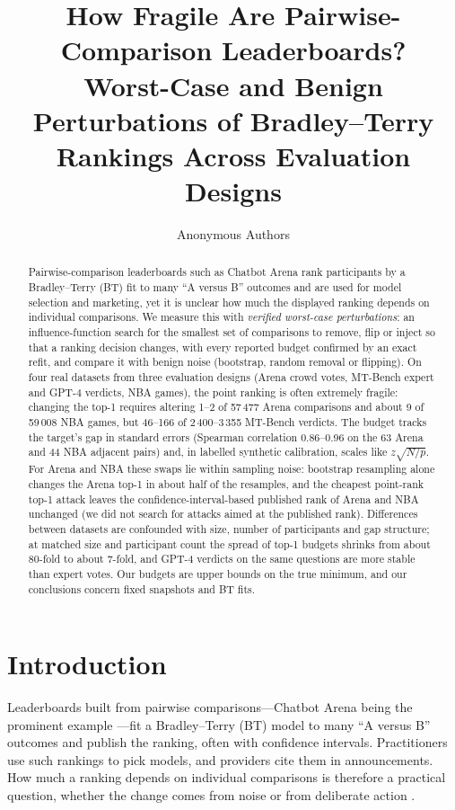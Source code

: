 \documentclass{article}
\title{How Fragile Are Pairwise-Comparison Leaderboards? \\
Worst-Case and Benign Perturbations of Bradley--Terry Rankings Across Evaluation Designs}
\author{Anonymous Authors}
\begin{document}
\maketitle

\begin{abstract}
Pairwise-comparison leaderboards such as Chatbot Arena rank participants by a Bradley--Terry (BT) fit to many ``A versus B'' outcomes and are used for model selection and marketing, yet it is unclear how much the displayed ranking depends on individual comparisons.
We measure this with \emph{verified worst-case perturbations}: an influence-function search for the smallest set of comparisons to remove, flip or inject so that a ranking decision changes, with every reported budget confirmed by an exact refit, and compare it with benign noise (bootstrap, random removal or flipping).
On four real datasets from three evaluation designs (Arena crowd votes, MT-Bench expert and GPT-4 verdicts, NBA games), the point ranking is often extremely fragile: changing the top-1 requires altering 1--2 of 57\,477 Arena comparisons and about 9 of 59\,008 NBA games, but 46--166 of 2\,400--3\,355 MT-Bench verdicts.
The budget tracks the target's gap in standard errors (Spearman correlation 0.86--0.96 on the 63 Arena and 44 NBA adjacent pairs) and, in labelled synthetic calibration, scales like $z\sqrt{N/p}$.
For Arena and NBA these swaps lie within sampling noise: bootstrap resampling alone changes the Arena top-1 in about half of the resamples, and the cheapest point-rank top-1 attack leaves the confidence-interval-based published rank of Arena and NBA unchanged (we did not search for attacks aimed at the published rank).
Differences between datasets are confounded with size, number of participants and gap structure; at matched size and participant count the spread of top-1 budgets shrinks from about 80-fold to about 7-fold, and GPT-4 verdicts on the same questions are more stable than expert votes.
Our budgets are upper bounds on the true minimum, and our conclusions concern fixed snapshots and BT fits.
\end{abstract}

\section{Introduction}\label{sec:intro}
Leaderboards built from pairwise comparisons---Chatbot Arena being the prominent example \citep{chiang2024arena}---fit a Bradley--Terry (BT) model \citep{bradley1952} to many ``A versus B'' outcomes and publish the ranking, often with confidence intervals. Practitioners use such rankings to pick models, and providers cite them in announcements. How much a ranking depends on individual comparisons is therefore a practical question, whether the change comes from noise or from deliberate action \citep{min2025rigging,singh2025illusion}.
\end{document}
